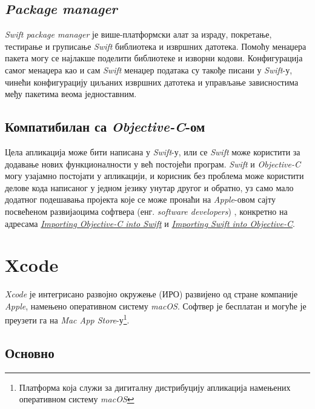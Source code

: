 \documentclass[12pt,oneside]{memoir}
\begin{document}
\subsection{\textit{Package manager}}

\textit{Swift package manager} је више-платформски алат за израду, покретање, тестирање и груписање \textit{Swift} библиотека и извршних датотека. Помоћу менаџера пакета могу се најлакше поделити библиотеке и изворни кодови. Конфигурација самог менаџера као и сам \textit{Swift} менаџер података су такође писани у \textit{Swift}-у, чинећи конфигурацију циљаних извршних датотека и управљање зависностима међу пакетима веома једноставним. 

\subsection{Компатибилан са \textit{Objective-C}-ом}

Цела апликација може бити написана у \textit{Swift}-у, или се \textit{Swift} може користити за додавање нових функционалности у већ постојећи програм. \textit{Swift} и \textit{Objective-C} могу узајамно постојати у апликацији, и корисник без проблема може користити делове кода написаног у једном језику унутар другог и обратно, уз само мало додатног подешавања пројекта које се може пронаћи на \textit{Apple}-овом сајту посвећеном развијаоцима софтвера (енг. \textit{software developers}) \cite{Apple_Developer}, конкретно на адресама \href{https://developer.apple.com/documentation/swift/imported_c_and_objective-c_apis/importing_objective-c_into_swift}{\textit{Importing Objective-C into Swift}} и \href{https://developer.apple.com/documentation/swift/imported_c_and_objective-c_apis/importing_swift_into_objective-c}{\textit{Importing Swift into Objective-C}}.

\section{Xcode}
\label{sec:Xcode}

\indent \textit{Xcode} је интегрисано развојно окружење (ИРО) развијено од стране компаније \textit{Apple}, намењено оперативном систему \textit{macOS}. Софтвер је бесплатан и могуће је преузети га на \textit{Mac App Store}-у\footnote{Платформа која служи за дигиталну дистрибуцију апликација намењених оперативном систему \textit{macOS}}.

\subsection{Основно}
\end{document}

